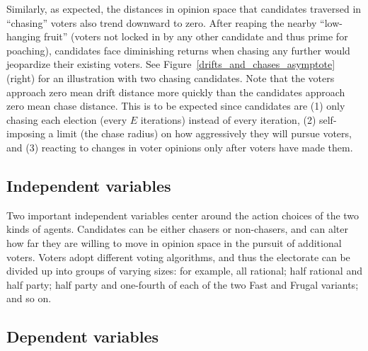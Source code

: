 Similarly, as expected, the distances in opinion space that candidates
traversed in ``chasing'' voters also trend downward to zero. After reaping the
nearby ``low-hanging fruit'' (voters not locked in by any other candidate and
thus prime for poaching), candidates face diminishing returns when chasing any
further would jeopardize their existing voters. See
Figure~\ref{drifts_and_chases_asymptote} (right) for an illustration with two
chasing candidates. Note that the voters approach zero mean drift distance more
quickly than the candidates approach zero mean chase distance. This is to be
expected since candidates are (1) only chasing each election (every $E$
iterations) instead of every iteration, (2) self-imposing a limit (the chase
radius) on how aggressively they will pursue voters, and (3) reacting to
changes in voter opinions only after voters have made them.


\subsection{Independent variables}


Two important independent variables center around the action choices of the two
kinds of agents. Candidates can be either chasers or non-chasers, and can alter
how far they are willing to move in opinion space in the pursuit of additional
voters. Voters adopt different voting algorithms, and thus the electorate can
be divided up into groups of varying sizes: for example, all rational; half
rational and half party; half party and one-fourth of each of the two Fast and
Frugal variants; and so on.

%
%
%
%
%    


\subsection{Dependent variables}

